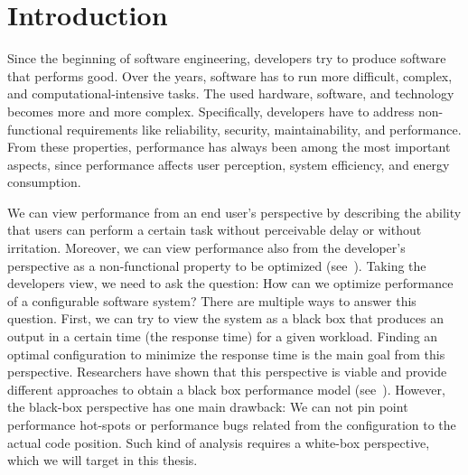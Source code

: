 \chapter{Introduction}
\label{chap:introduction}

Since the beginning of software engineering, developers try to produce software that performs good. 
Over the years, software has to run more difficult, complex, and computational-intensive tasks. 
The used hardware, software, and technology becomes more and more complex.
Specifically, developers have to address non-functional requirements like reliability, security, maintainability, and performance. 
From these properties, performance has always been among the most important aspects, since performance affects user perception, system efficiency, and energy consumption.

We can view performance from an end user's perspective by describing the ability that users can perform a certain task without perceivable delay or without irritation.
Moreover, we can view performance also from the developer's perspective as a non-functional property to be optimized (see~\cite{Molyneaux:2009:AAP:1550832}).
Taking the developers view, we need to ask the question: How can we optimize performance of a configurable software system? There are multiple ways to answer this question. First, we can try to view the system as a black box that produces an output in a certain time (the response time) for a given workload. Finding an optimal configuration to minimize the response time is the main goal from this perspective. Researchers have shown that this perspective is viable and provide different approaches to obtain a black box performance model (see~\cite{Molyneaux:2009:AAP:1550832,weber2005key,siegmund2015performance,smith1993software}). However, the black-box perspective has one main drawback: We can not pin point performance hot-spots or performance bugs related from the configuration to the actual code position. Such kind of analysis requires a white-box perspective, which we will target in this thesis.






